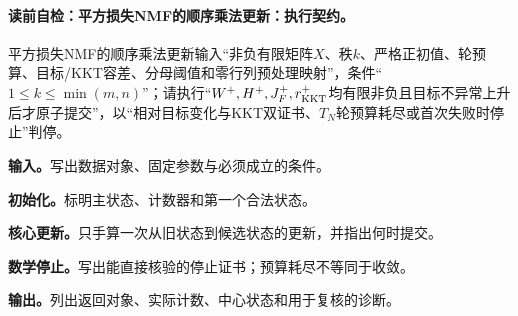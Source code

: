 \paragraph{读前自检：平方损失NMF的顺序乘法更新：执行契约。}平方损失NMF的顺序乘法更新输入“非负有限矩阵$X$、秩$k$、严格正初值、轮预算、目标/KKT容差、分母阈值和零行列预处理映射”，条件“$1\le k\le\min(m,n)$”；请执行“$W^+,H^+,J_F^+,r_{\rm KKT}^+$均有限非负且目标不异常上升后才原子提交”，以“相对目标变化与KKT双证书、$T_N$轮预算耗尽或首次失败时停止”判停。\par
\begin{keypointbox}[title={平方损失NMF的顺序乘法更新：五步阅读}]
\textbf{输入。}写出数据对象、固定参数与必须成立的条件。\par
\textbf{初始化。}标明主状态、计数器和第一个合法状态。\par
\textbf{核心更新。}只手算一次从旧状态到候选状态的更新，并指出何时提交。\par
\textbf{数学停止。}写出能直接核验的停止证书；预算耗尽不等同于收敛。\par
\textbf{输出。}列出返回对象、实际计数、中心状态和用于复核的诊断。
\end{keypointbox}

